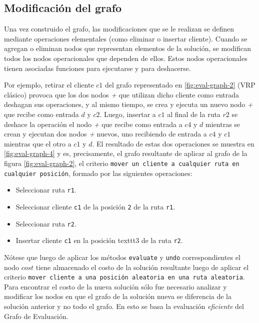 \subsection{Modificación del grafo}
Una vez construido el grafo, las modificaciones que se le realizan se definen mediante operaciones elementales (como eliminar o insertar cliente). Cuando se agregan o eliminan nodos que representan elementos de la solución, se modifican todos los nodos operacionales que dependen de ellos. Estos nodos operacionales tienen asociadas funciones para ejecutarse y para deshacerse. 

Por ejemplo, retirar el cliente $c1$ del grafo representado en \ref{fig:eval-graph-2} (VRP clásico) provoca que los dos nodos \textit{+} que utilizan dicho cliente como entrada deshagan sus operaciones, y al mismo tiempo, se crea y ejecuta un nuevo nodo \textit{+} que recibe como entrada $d$ y $c2$. Luego, insertar a $c1$ al final de la ruta $r2$ se deshace la operación el nodo \textit{+} que recibe como entrada a $c4$ y $d$ mientras se crean y ejecutan dos nodos \textit{+} nuevos, uno recibiendo de entrada a $c4$ y $c1$ mientras que el otro a $c1$ y $d$. El resultado de estas dos operaciones se muestra en \ref{fig:eval-graph-4} y es, precisamente, el grafo resultante de aplicar al grafo de la figura \ref{fig:eval-graph-2}, el criterio \texttt{mover un cliente a cualquier ruta en cualquier posición}, formado por las siguientes operaciones:

\begin{itemize}
	\item Seleccionar ruta \texttt{r1}.
	\item Seleccionar cliente \texttt{c1} de la posición \texttt{2} de la ruta \texttt{r1}.
	\item Seleccionar ruta \texttt{r2}.
	\item Insertar cliente \texttt{c1} en la posición texttt{3} de la ruta \texttt{r2}.
\end{itemize}

Nótese que luego de aplicar los métodos \texttt{evaluate} y \texttt{undo} correspondientes el nodo $cost$ tiene almacenado el costo de la solución resultante luego de aplicar el criterio \texttt{mover cliente a una posición aleatoria en una ruta aleatoria}. Para encontrar el costo de la nueva solución sólo fue necesario analizar y modificar los nodos en que el grafo de la solución nueva se diferencia de la solución anterior y no todo el grafo. En esto se basa la evaluación \textit{eficiente} del Grafo de Evaluación.

